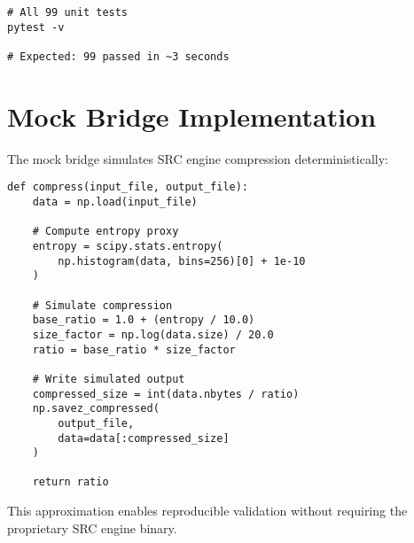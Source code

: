 \documentclass[11pt,twocolumn]{article}
\begin{document}
\begin{verbatim}
# All 99 unit tests
pytest -v

# Expected: 99 passed in ~3 seconds
\end{verbatim}

\section{Mock Bridge Implementation}

The mock bridge simulates SRC engine compression deterministically:

\begin{verbatim}
def compress(input_file, output_file):
    data = np.load(input_file)

    # Compute entropy proxy
    entropy = scipy.stats.entropy(
        np.histogram(data, bins=256)[0] + 1e-10
    )

    # Simulate compression
    base_ratio = 1.0 + (entropy / 10.0)
    size_factor = np.log(data.size) / 20.0
    ratio = base_ratio * size_factor

    # Write simulated output
    compressed_size = int(data.nbytes / ratio)
    np.savez_compressed(
        output_file,
        data=data[:compressed_size]
    )

    return ratio
\end{verbatim}

This approximation enables reproducible validation without requiring the proprietary SRC engine binary.
\end{document}
